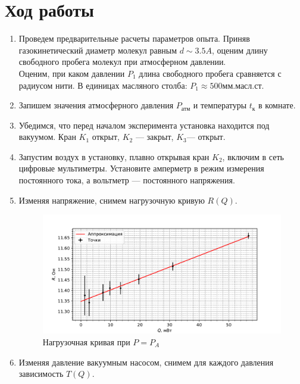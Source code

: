 \documentclass[12pt]{article}
\begin{document}
    \section{Ход работы}
        \begin{enumerate}
            \item Проведем предварительные расчеты параметров опыта. Приняв газокинетический диаметр молекул равным $d \sim 3.5 A$, оценим
            длину свободного пробега молекул при атмосферном давлении.\\
            Оценим, при каком давлении $P_1$ длина свободного пробега сравняется с радиусом нити. В единицах масляного столба: $P_1 \approx 500 \text{мм.масл.ст.}$
            \item Запишем значения атмосферного давления $P_{\text{атм}}$ и температуры $t_{\text{к}}$ в комнате.
            \item Убедимся, что перед началом эксперимента установка находится под вакуумом. Кран $K_1$ открыт, $K_2$ — закрыт, $K_3$— открыт.
            \item Запустим воздух в установку, плавно открывая кран $K_2$, включим в сеть цифровые мультиметры. Установите амперметр в режим
            измерения постоянного тока, а вольтметр — постоянного напряжения.
            \item Изменяя напряжение, снимем нагрузочную кривую $R(Q)$.

            \begin{figure}[h]
                \centering
                \includegraphics[width=\textwidth]{graphs/QR.pdf}
                \caption{Нагрузочная кривая при $P = P_A$}
            \end{figure}

            \item Изменяя давление вакуумным насосом, снимем для каждого давления
            зависимость $T(Q)$.


\end{enumerate}
\end{document}
